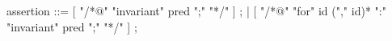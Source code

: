 \begin{syntax}
  assertion ::= [ { "/*@" "invariant" pred ";" "*/" } ] ;
  | [ { "/*@" "for" id ("," id)* ":" "invariant" pred ";" "*/" } ] ;
\end{syntax}
